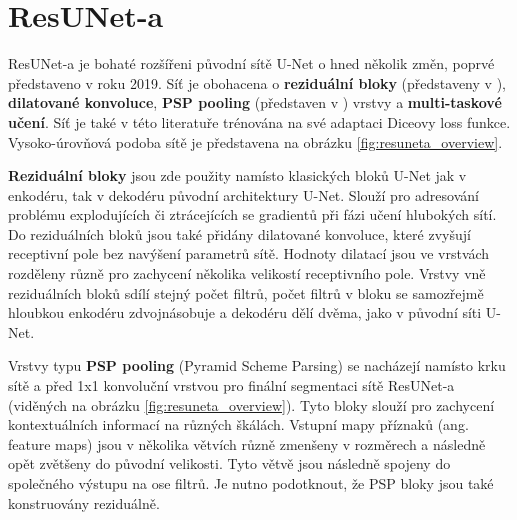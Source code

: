 \section{ResUNet-a}
\label{sec:Chapter25}

ResUNet-a je bohaté rozšířeni původní sítě U-Net o hned několik změn, poprvé představeno v \cite{resuneta} roku 2019. Síť je obohacena o \textbf{reziduální bloky} (představeny v \cite{residualblocks}), \textbf{dilatované konvoluce}, \textbf{PSP pooling} (představen v \cite{psp}) vrstvy a \textbf{multi-taskové učení}. Síť je také v této literatuře trénována na své adaptaci Diceovy loss funkce. Vysoko-úrovňová podoba sítě je představena na obrázku \ref{fig:resuneta_overview}.

\textbf{Reziduální bloky} jsou zde použity namísto klasických bloků U-Net jak v enkodéru, tak v dekodéru původní architektury U-Net. Slouží pro adresování problému explodujících či ztrácejících se gradientů při fázi učení hlubokých sítí. Do reziduálních bloků jsou také přidány dilatované konvoluce, které zvyšují receptivní pole bez navýšení parametrů sítě. Hodnoty dilatací jsou ve vrstvách rozděleny různě pro zachycení několika velikostí receptivního pole. Vrstvy vně reziduálních bloků sdílí stejný počet filtrů, počet filtrů v bloku se samozřejmě hloubkou enkodéru zdvojnásobuje a dekodéru dělí dvěma, jako v původní síti U-Net.

Vrstvy typu \textbf{PSP pooling} (Pyramid Scheme Parsing) se nacházejí namísto krku sítě a před 1x1 konvoluční vrstvou pro finální segmentaci sítě ResUNet-a (viděných na obrázku \ref{fig:resuneta_overview}). Tyto bloky slouží pro zachycení kontextuálních informací na různých škálách. Vstupní mapy příznaků (ang. feature maps) jsou v několika větvích různě zmenšeny v rozměrech a následně opět zvětšeny do původní velikosti. Tyto větvě jsou následně spojeny do společného výstupu na ose filtrů. Je nutno podotknout, že PSP bloky jsou také konstruovány reziduálně.

